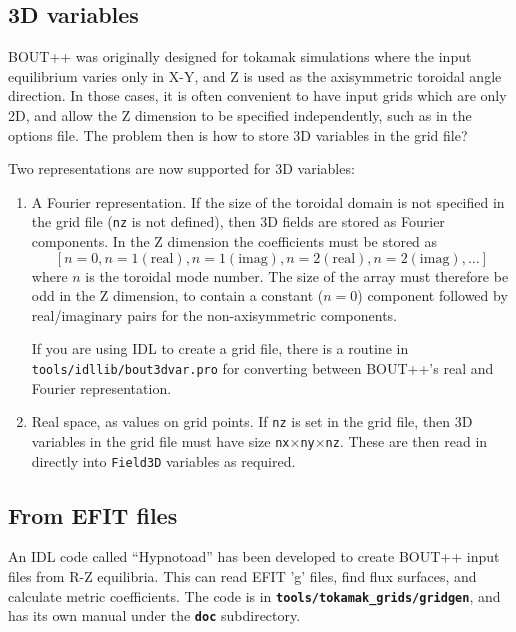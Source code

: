 \documentclass[12pt]{article}
\newcommand{\file}[1]{\texttt{\bf #1}}
\begin{document}
\subsection{3D variables}

BOUT++ was originally designed for tokamak simulations where the input equilibrium varies only in X-Y, and Z is used as
the axisymmetric toroidal angle direction. In those cases, it is often convenient to have input grids which are only 2D,
and allow the Z dimension to be specified independently, such as in the options file. The problem then is how to store 3D variables
in the grid file? 

Two representations are now supported for 3D variables:
\begin{enumerate}
\item A Fourier representation. If the size of the toroidal domain is not specified in the grid file (\texttt{nz} is not
defined), then 3D fields are stored as Fourier components. In the Z dimension the coefficients must be stored as
\[
\left[n = 0, n = 1 (\textrm{real}), n = 1 (\textrm{imag}), n = 2 (\textrm{real}), n = 2 (\textrm{imag}), \ldots \right]
\]
where $n$ is the toroidal mode number. The size of the array must therefore be odd in the Z dimension, to contain
a constant ($n=0$) component followed by real/imaginary pairs for the non-axisymmetric components.

If you are using IDL to create a grid file, there is a routine in \texttt{tools/idllib/bout3dvar.pro} for converting
between BOUT++'s real and Fourier representation.

\item Real space, as values on grid points. If \texttt{nz} is set in the grid file, then 3D variables in the grid file must have
  size \texttt{nx}$\times$\texttt{ny}$\times$\texttt{nz}. These are then read in directly into \texttt{Field3D} variables
  as required. 
\end{enumerate}





\subsection{From EFIT files}
An IDL code called ``Hypnotoad'' has been developed to create BOUT++ input files from
R-Z equilibria. This can read EFIT 'g' files, find flux surfaces, and calculate metric coefficients.
The code is in \file{tools/tokamak\_grids/gridgen}, and has its own manual under the \file{doc} subdirectory.
\end{document}
